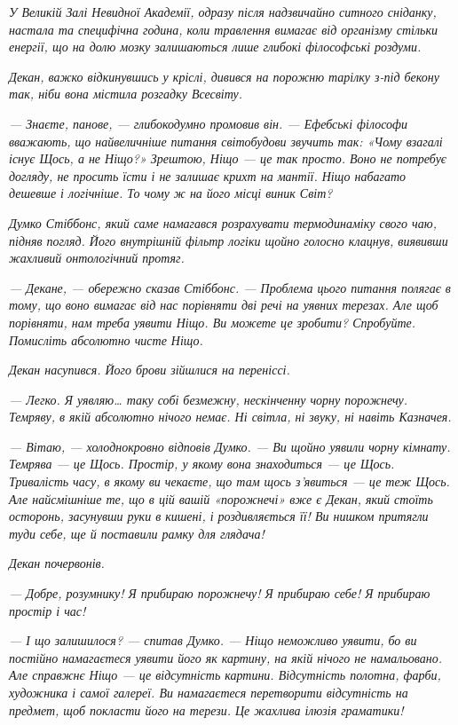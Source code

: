 \documentclass[12pt, a4paper, openany]{book}
\begin{document}
\begin{terrybox}
\textit{У Великій Залі Невидної Академії, одразу після надзвичайно ситного сніданку, настала та специфічна година, коли травлення вимагає від організму стільки енергії, що на долю мозку залишаються лише глибокі філософські роздуми.}

\textit{Декан, важко відкинувшись у кріслі, дивився на порожню тарілку з-під бекону так, ніби вона містила розгадку Всесвіту.}

\textit{--- Знаєте, панове, --- глибокодумно промовив він. --- Ефебські філософи вважають, що найвеличніше питання світобудови звучить так: «Чому взагалі існує Щось, а не Ніщо?» Зрештою, Ніщо --- це так просто. Воно не потребує догляду, не просить їсти і не залишає крихт на мантії. Ніщо набагато дешевше і логічніше. То чому ж на його місці виник Світ?}

\textit{Думко Стіббонс, який саме намагався розрахувати термодинаміку свого чаю, підняв погляд. Його внутрішній фільтр логіки щойно голосно клацнув, виявивши жахливий онтологічний протяг.}

\textit{--- Декане, --- обережно сказав Стіббонс. --- Проблема цього питання полягає в тому, що воно вимагає від нас порівняти дві речі на уявних терезах. Але щоб порівняти, нам треба уявити Ніщо. Ви можете це зробити? Спробуйте. Помисліть абсолютно чисте Ніщо.}

\textit{Декан насупився. Його брови зійшлися на переніссі.}

\textit{--- Легко. Я уявляю\ldots{} таку собі безмежну, нескінченну чорну порожнечу. Темряву, в якій абсолютно нічого немає. Ні світла, ні звуку, ні навіть Казначея.}

\textit{--- Вітаю, --- холоднокровно відповів Думко. --- Ви щойно уявили чорну кімнату. Темрява --- це Щось. Простір, у якому вона знаходиться --- це Щось. Тривалість часу, в якому ви чекаєте, що там щось з'явиться --- це теж Щось. Але найсмішніше те, що в цій вашій «порожнечі» вже є Декан, який стоїть осторонь, засунувши руки в кишені, і роздивляється її! Ви нишком притягли туди себе, ще й поставили рамку для глядача!}

\textit{Декан почервонів.}

\textit{--- Добре, розумнику! Я прибираю порожнечу! Я прибираю себе! Я прибираю простір і час!}

\textit{--- І що залишилося? --- спитав Думко. --- Ніщо неможливо уявити, бо ви постійно намагаєтеся уявити його як картину, на якій нічого не намальовано. Але справжнє Ніщо --- це відсутність картини. Відсутність полотна, фарби, художника і самої галереї. Ви намагаєтеся перетворити відсутність на предмет, щоб покласти його на терези. Це жахлива ілюзія граматики!}


\end{terrybox}
\end{document}

